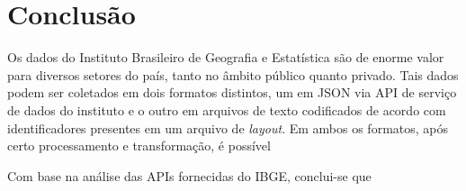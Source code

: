 \chapter{Conclusão}

Os dados do Instituto Brasileiro de Geografia e Estatística são de enorme valor para diversos setores do país, tanto no âmbito público quanto privado. Tais dados podem ser coletados em dois formatos distintos, um em JSON via API de serviço de dados do instituto e o outro em arquivos de texto codificados de acordo com identificadores presentes em um arquivo de \textit{layout}. Em ambos os formatos, após certo processamento e transformação, é possível

Com base na análise das APIs fornecidas do IBGE, conclui-se que 






